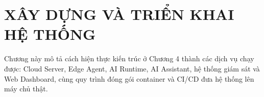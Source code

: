 \chapter{XÂY DỰNG VÀ TRIỂN KHAI HỆ THỐNG}

Chương này mô tả cách hiện thực kiến trúc ở Chương 4 thành các dịch vụ chạy
được: Cloud Server, Edge Agent, AI Runtime, AI Assistant, hệ thống giám sát và
Web Dashboard, cùng quy trình đóng gói container và CI/CD đưa hệ thống lên máy
chủ thật.









